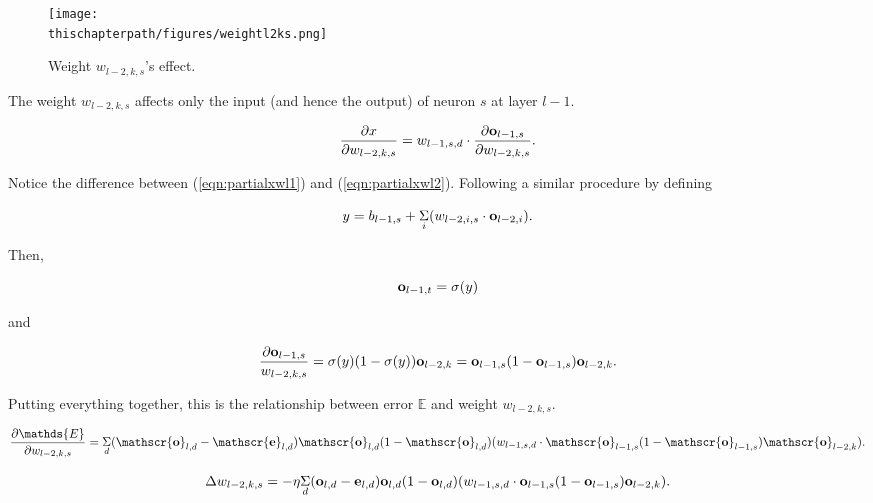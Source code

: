 \begin{figure}[h]
\centering
{\texttt{[image: \\thischapterpath/figures/weightl2ks.png]}}
\caption{Weight $w_{l-2, k,s}$'s effect.}
  \label{fig:weightl2ks}
\end{figure}


The weight $w_{l-2, k, s}$ affects only the input (and hence the
output) of neuron $s$ at layer $l-1$.


\begin{equation}
\frac{\partial x} {\partial w_{l-2, k, s}} = w_{l-1,  s, d}
\cdot
\frac{\partial \mathscr{\bf o}_{l-1, s}}{\partial w_{l-2,  k, s}}.
\label{eqn:partialxwl2}
\end{equation}

Notice the difference between (\ref{eqn:partialxwl1}) and
(\ref{eqn:partialxwl2}).    Following a similar
procedure by defining

\begin{equation}
y =  b_{l-1, s} + \underset{i}{\Sigma} (w_{l-2, i, s}
\cdot \mathscr{\bf o}_{l- 2,  i}).
\end{equation}

Then,

\begin{equation}
\mathscr{\bf o}_{l-1, t} = \sigma(y)
\end{equation}

and

\begin{equation}
\frac{\partial \mathscr{\bf o}_{l-1, s}}{w_{l-2, k, s}}  =
\sigma (y)(1 - \sigma(y)) \mathscr{\bf o}_{l-2, k}
= \mathscr{\bf o}_{l-1, s} (1 - \mathscr{\bf o}_{l-1, s})
\mathscr{\bf o}_{l-2, k}.
\end{equation}

Putting everything together, this is the relationship between error
$\mathds{E}$ and weight $w_{l-2, k, s}$.

\begin{equation}
\frac{\partial \mathds{E}}{\partial w_{l-2,  k, s}}
= \underset{d}{\Sigma}
(\mathscr{\bf o}_{l, d} -   \mathscr{\bf e} _{l, d})
\mathscr{\bf o}_{l, d}
(1 - \mathscr{\bf o}_{l, d})
 (w_{l-1, s, d} \cdot
 \mathscr{\bf o}_{l-1, s}
  (1 - \mathscr{\bf o}_{l-1, s})
\mathscr{\bf o}_{l-2, k}).
\end{equation}



\begin{equation}
\Delta  w_{l-2,  k, s}
= -\eta \underset{d}{\Sigma}
(\mathscr{\bf o}_{l, d} -   \mathscr{\bf e} _{l, d})
\mathscr{\bf o}_{l, d}
(1 - \mathscr{\bf o}_{l, d})
 (w_{l-1, s, d} \cdot
 \mathscr{\bf o}_{l-1, s}
  (1 - \mathscr{\bf o}_{l-1, s})
\mathscr{\bf o}_{l-2, k}).
\end{equation}

